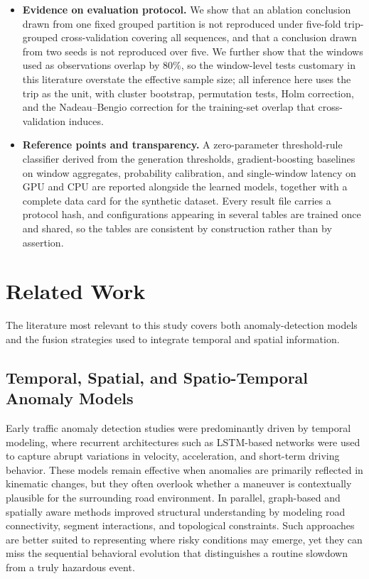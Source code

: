 \documentclass[journal]{IEEEtran}
\begin{document}
\begin{itemize}
  \item \textbf{Evidence on evaluation protocol.} We show that an ablation conclusion drawn from one fixed grouped partition is not reproduced under five-fold trip-grouped cross-validation covering all sequences, and that a conclusion drawn from two seeds is not reproduced over five. We further show that the windows used as observations overlap by $80\%$, so the window-level tests customary in this literature overstate the effective sample size; all inference here uses the trip as the unit, with cluster bootstrap, permutation tests, Holm correction, and the Nadeau--Bengio correction for the training-set overlap that cross-validation induces.
  \item \textbf{Reference points and transparency.} A zero-parameter threshold-rule classifier derived from the generation thresholds, gradient-boosting baselines on window aggregates, probability calibration, and single-window latency on GPU and CPU are reported alongside the learned models, together with a complete data card for the synthetic dataset. Every result file carries a protocol hash, and configurations appearing in several tables are trained once and shared, so the tables are consistent by construction rather than by assertion.
\end{itemize}

\section{Related Work}
The literature most relevant to this study covers both anomaly-detection models and the fusion strategies used to integrate temporal and spatial information.

\subsection{Temporal, Spatial, and Spatio-Temporal Anomaly Models}
Early traffic anomaly detection studies were predominantly driven by temporal modeling, where recurrent architectures such as LSTM-based networks were used to capture abrupt variations in velocity, acceleration, and short-term driving behavior. These models remain effective when anomalies are primarily reflected in kinematic changes, but they often overlook whether a maneuver is contextually plausible for the surrounding road environment. In parallel, graph-based and spatially aware methods improved structural understanding by modeling road connectivity, segment interactions, and topological constraints. Such approaches are better suited to representing where risky conditions may emerge, yet they can miss the sequential behavioral evolution that distinguishes a routine slowdown from a truly hazardous event.
\end{document}
